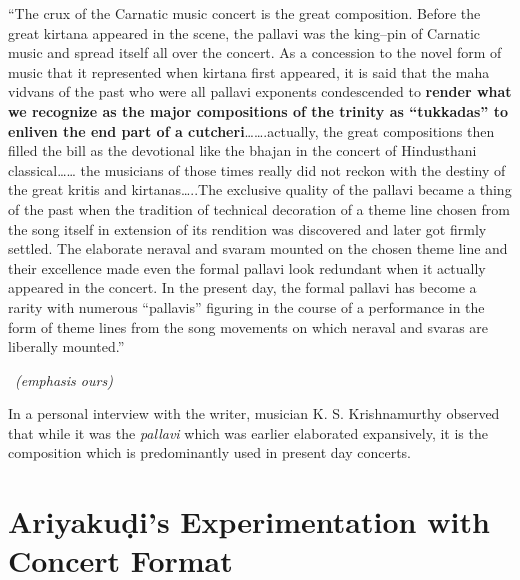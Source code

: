 \begin{myquote}
“The crux of the Carnatic music concert is the great composition. Before the great kirtana appeared in the scene, the pallavi was the king–pin of Carnatic music and spread itself all over the concert. As a concession to the novel form of music that it represented when kirtana first appeared, it is said that the maha vidvans of the past who were all pallavi exponents condescended to \textbf{render what we recognize as the major compositions of the trinity as “tukkadas” to enliven the end part of a cutcheri}…….actually, the great compositions then filled the bill as the devotional like the bhajan in the concert of Hindusthani classical…… the musicians of those times really did not reckon with the destiny of the great kritis and kirtanas…..The exclusive quality of the pallavi became a thing of the past when the tradition of technical decoration of a theme line chosen from the song itself in extension of its rendition was discovered and later got firmly settled. The elaborate neraval and svaram mounted on the chosen theme line and their excellence made even the formal pallavi look redundant when it actually appeared in the concert. In the present day, the formal pallavi has become a rarity with numerous “pallavis” figuring in the course of a performance in the form of theme lines from the song movements on which neraval and svaras are liberally mounted.”
\end{myquote}

\vspace{-.3cm}

\begin{myquote}

~\hfill \textit{(emphasis ours)}
\end{myquote}

In a personal interview with the writer, musician K. S. Krishnamurthy observed that while it was the \textit{pallavi} which was earlier elaborated expansively, it is the composition which is predominantly used in present day concerts.


\section*{Ariyakuḍi’s Experimentation with Concert Format}

